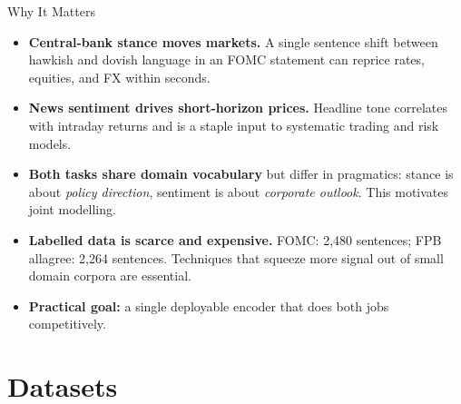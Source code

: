 \documentclass[10pt, aspectratio=169]{beamer}
\begin{document}
\begin{frame}{Why It Matters}
    \begin{itemize}\setlength{\itemsep}{0.3em}
        \item \textbf{Central-bank stance moves markets.} A single sentence shift between hawkish and dovish language in an FOMC statement can reprice rates, equities, and FX within seconds.
        \item \textbf{News sentiment drives short-horizon prices.} Headline tone correlates with intraday returns and is a staple input to systematic trading and risk models.
        \item \textbf{Both tasks share domain vocabulary} but differ in pragmatics: stance is about \textit{policy direction}, sentiment is about \textit{corporate outlook}. This motivates \alert{joint modelling}.
        \item \textbf{Labelled data is scarce and expensive.} FOMC: 2{,}480 sentences; FPB allagree: 2{,}264 sentences. Techniques that squeeze more signal out of small domain corpora are essential.
        \item \textbf{Practical goal:} a single deployable encoder that does both jobs competitively.
    \end{itemize}
\end{frame}

\section{Datasets}
\end{document}
